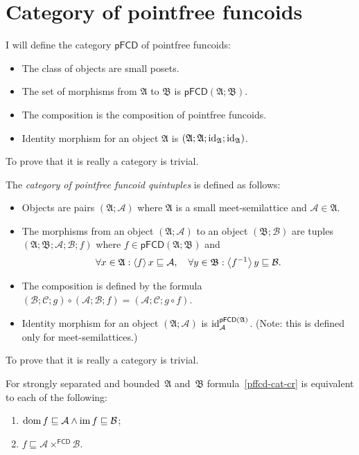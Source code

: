 \section{Category of pointfree funcoids}

I will define the category
$\mathsf{pFCD}$ of pointfree funcoids:
\begin{itemize}
\item The class of objects are small posets.
\item The set of morphisms from $\mathfrak{A}$ to $\mathfrak{B}$ is $\mathsf{pFCD}(\mathfrak{A};\mathfrak{B})$.
\item The composition is the composition of pointfree funcoids.
\item Identity morphism for an object $\mathfrak{A}$ is $(\mathfrak{A};\mathfrak{A};\operatorname{id}_{\mathfrak{A}};\operatorname{id}_{\mathfrak{A}})$.
\end{itemize}
To prove that it is really a category is trivial.

The \emph{category of
pointfree funcoid quintuples} is defined as follows:
\begin{itemize}
\item Objects are pairs $(\mathfrak{A};\mathcal{A})$ where $\mathfrak{A}$
is a small meet-semilattice and $\mathcal{A}\in\mathfrak{A}$.
\item The morphisms from an object $(\mathfrak{A};\mathcal{A})$ to an object
$(\mathfrak{B};\mathcal{B})$ are tuples $(\mathfrak{A};\mathfrak{B};\mathcal{A};\mathcal{B};f)$
where $f\in\mathsf{pFCD}(\mathfrak{A};\mathfrak{B})$ and
\begin{equation}\label{pffcd-cat-cr}
\forall x\in\mathfrak{A}:\left\langle f\right\rangle x\sqsubseteq\mathcal{A},\quad \forall y\in\mathfrak{B}:\left\langle f^{-1}\right\rangle y\sqsubseteq\mathcal{B}.
\end{equation}
\item The composition is defined by the formula $(\mathcal{B};\mathcal{C};g)\circ(\mathcal{A};\mathcal{B};f)=(\mathcal{A};\mathcal{C};g\circ f)$.
\item Identity morphism for an object $(\mathfrak{A};\mathcal{A})$ is $\operatorname{id}_{\mathcal{A}}^{\mathsf{pFCD}(\mathfrak{A})}$.
(Note: this is defined only for meet-semilattices.)
\end{itemize}
To prove that it is really a category is trivial.

\begin{prop}
For strongly separated and bounded~$\mathfrak{A}$ and~$\mathfrak{B}$ formula~\eqref{pffcd-cat-cr} is equivalent to each of the following:
\begin{enumerate}
\item $\operatorname{dom} f\sqsubseteq\mathcal{A}\land\operatorname{im} f\sqsubseteq\mathcal{B}$;
\item $f\sqsubseteq\mathcal{A}\times^{\mathsf{FCD}}\mathcal{B}$.
\end{enumerate}
\end{prop}

